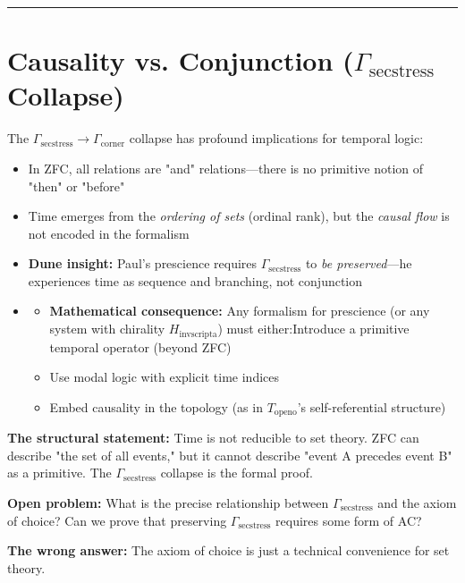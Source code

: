 \documentclass[12pt,a4paper]{article}
\begin{document}
\begin{center}
\rule{0.5\textwidth}{0.4pt}
\end{center}

\section{Causality vs. Conjunction ($\Gamma_{\text{secstress}}$ Collapse)}

The $\Gamma_{\text{secstress}} \to \Gamma_{\text{corner}}$ collapse has profound implications for temporal logic:

\begin{itemize}
    \item In ZFC, all relations are "and" relations---there is no primitive notion of "then" or "before"
    \item Time emerges from the \emph{ordering of sets} (ordinal rank), but the \emph{causal flow} is not encoded in the formalism
    \item \textbf{Dune insight:} Paul's prescience requires $\Gamma_{\text{secstress}}$ to \emph{be preserved}---he experiences time as sequence and branching, not conjunction
    \item 
    \begin{itemize}
    \item \textbf{Mathematical consequence:} Any formalism for prescience (or any system with chirality $H_{\text{invscripta}}$) must either:Introduce a primitive temporal operator (beyond ZFC)
    \item Use modal logic with explicit time indices
    \item Embed causality in the topology (as in $T_{\text{openo}}$'s self-referential structure)
\end{itemize}

\end{itemize}

\textbf{The structural statement:} Time is not reducible to set theory. ZFC can describe "the set of all events," but it cannot describe "event A precedes event B" as a primitive. The $\Gamma_{\text{secstress}}$ collapse is the formal proof.

\textbf{Open problem:} What is the precise relationship between $\Gamma_{\text{secstress}}$ and the axiom of choice? Can we prove that preserving $\Gamma_{\text{secstress}}$ requires some form of AC?

\textbf{The wrong answer:} The axiom of choice is just a technical convenience for set theory.
\end{document}
